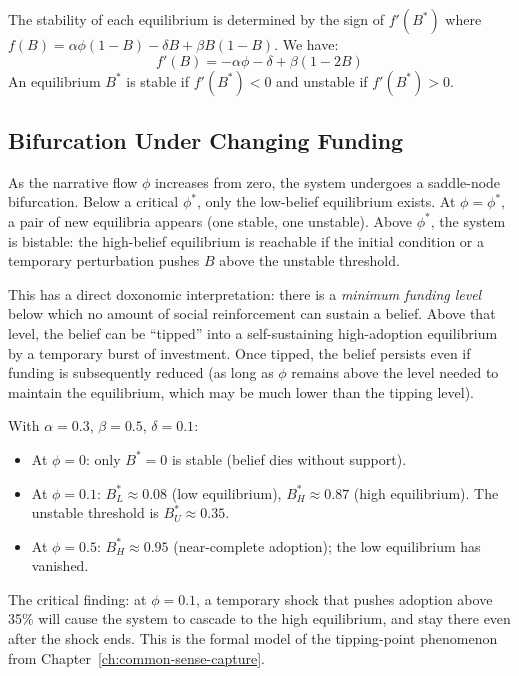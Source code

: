 The stability of each equilibrium is determined by the sign of $f'(B^*)$ where $f(B) = \alpha\phi(1-B) - \delta B + \beta B(1-B)$.
We have:
\[
  f'(B) = -\alpha\phi - \delta + \beta(1 - 2B)
\]
An equilibrium $B^*$ is stable if $f'(B^*) < 0$ and unstable if $f'(B^*) > 0$.

\subsection{Bifurcation Under Changing Funding}

\begin{proposition}
\label{prop:bifurcation}
As the narrative flow $\phi$ increases from zero, the system undergoes a saddle-node bifurcation.
Below a critical $\phi^*$, only the low-belief equilibrium exists.
At $\phi = \phi^*$, a pair of new equilibria appears (one stable, one unstable).
Above $\phi^*$, the system is bistable: the high-belief equilibrium is reachable if the initial condition or a temporary perturbation pushes $B$ above the unstable threshold.
\end{proposition}

This has a direct doxonomic interpretation: there is a \emph{minimum funding level} below which no amount of social reinforcement can sustain a belief.
Above that level, the belief can be ``tipped'' into a self-sustaining high-adoption equilibrium by a temporary burst of investment.
Once tipped, the belief persists even if funding is subsequently reduced (as long as $\phi$ remains above the level needed to maintain the equilibrium, which may be much lower than the tipping level).

\begin{example}
\label{ex:stock-flow-numerical}
With $\alpha = 0.3$, $\beta = 0.5$, $\delta = 0.1$:
\begin{itemize}[nosep]
  \item At $\phi = 0$: only $B^* = 0$ is stable (belief dies without support).
  \item At $\phi = 0.1$: $B_L^* \approx 0.08$ (low equilibrium), $B_H^* \approx 0.87$ (high equilibrium).
  The unstable threshold is $B_U^* \approx 0.35$.
  \item At $\phi = 0.5$: $B_H^* \approx 0.95$ (near-complete adoption); the low equilibrium has vanished.
\end{itemize}
The critical finding: at $\phi = 0.1$, a temporary shock that pushes adoption above 35\% will cause the system to cascade to the high equilibrium, and stay there even after the shock ends.
This is the formal model of the tipping-point phenomenon from Chapter~\ref{ch:common-sense-capture}.
\end{example}


